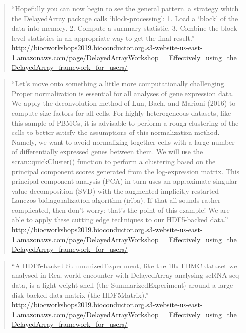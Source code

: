 \documentclass[]{tufte-book}
\begin{document}
\begin{quote}
``Hopefully you can now begin to see the general pattern, a strategy which the DelayedArray package calls `block-processing': 1. Load a `block' of the data into memory.
2. Compute a summary statistic.
3. Combine the block-level statistics in an appropriate way to get the final result.''
\url{http://biocworkshops2019.bioconductor.org.s3-website-us-east-1.amazonaws.com/page/DelayedArrayWorkshop__Effectively_using_the_DelayedArray_framework_for_users/}
\end{quote}

\begin{quote}
``Let's move onto something a little more computationally challenging. Proper normalization is essential for all analyses of gene expression data. We apply the deconvolution method of Lun, Bach, and Marioni (2016) to compute size factors for all cells.
For highly heterogeneous datasets, like this sample of PBMCs, it is advisable to perform a rough clustering of the cells to better satisfy the assumptions of this normalization method. Namely, we want to avoid normalizing together cells with a large number of differentially expressed genes between them.
We will use the scran::quickCluster() function to perform a clustering based on the principal component scores generated from the log-expression matrix. This principal component analysis (PCA) in turn uses an approximate singular value decomposition (SVD) with the augmented implicitly restarted Lanczos bidiagonalization algorithm (irlba). If that all sounds rather complicated, then don't worry: that's the point of this example! We are able to apply these cutting edge techniques to our HDF5-backed data.'' \url{http://biocworkshops2019.bioconductor.org.s3-website-us-east-1.amazonaws.com/page/DelayedArrayWorkshop__Effectively_using_the_DelayedArray_framework_for_users/}
\end{quote}

\begin{quote}
``A HDF5-backed SummarizedExperiment, like the 10x PBMC dataset we analysed in Real world encounter with DelayedArray analysing scRNA-seq data, is a light-weight shell (the SummarizedExperiment) around a large disk-backed data matrix (the HDF5Matrix).'' \url{http://biocworkshops2019.bioconductor.org.s3-website-us-east-1.amazonaws.com/page/DelayedArrayWorkshop__Effectively_using_the_DelayedArray_framework_for_users/}
\end{quote}
\end{document}
